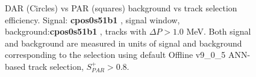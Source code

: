 \begin{figure}[H]
  \hspace{-0.6in}
  \caption{
    \label{fig:mumep_trq_ann} 
    DAR (Circles) vs PAR (squares) background vs track selection efficiency.
    Signal: {\bf cpos0s51b1} , signal window, background:{\bf cpos0s51b1} , tracks with $\Delta{P} > 1.0$ MeV.
    Both signal and background are measured in units of signal and background corresponding to the selection
    using default Offline v9\_0\_5 ANN-based track selection, $S_{PAR}^+ > 0.8$.
  }
\end{figure}

